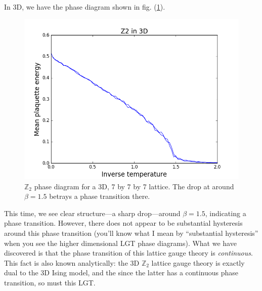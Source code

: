 \documentclass[9pt,twocolumn,twoside]{article}
\begin{document}
In 3D, we have the phase diagram shown in fig. (\ref{z2,3d}).
\begin{figure}[h!]
	\begin{centering}
	\includegraphics[width=\columnwidth]{z2,3d}
	\caption[$\mathbb{Z}_2$ lattice gauge theory phase diagram for a 3D lattice.]{$\mathbb{Z}_2$ phase diagram for a 3D, 7 by 7 by 7 lattice.  The drop at around $\beta=1.5$ betrays a phase transition there.}
	\label{z2,3d}
	\end{centering}
\end{figure}
This time, we see clear structure---a sharp drop---around $\beta=1.5$, indicating a phase transition.  However, there does not appear to be substantial hysteresis around this phase transition (you'll know what I mean by ``substantial hysteresis'' when you see the higher dimensional LGT phase diagrams).  What we have discovered is that the phase transition of this lattice gauge theory is \textit{continuous}.  This fact is also known analytically: the 3D $\mathbb{Z}_2$ lattice gauge theory is exactly dual to the 3D Ising model, and the since the latter has a continuous phase transition, so must this LGT.
\end{document}
